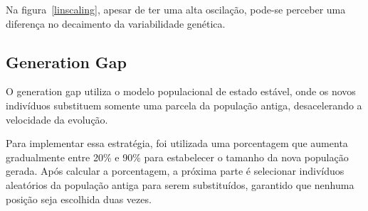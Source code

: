 \documentclass[12pt]{article}
\begin{document}
Na figura~\ref{linscaling}, apesar de ter uma alta oscilação, pode-se perceber uma 
diferença no decaimento da variabilidade genética.

\subsection{Generation Gap}

O generation gap utiliza o modelo populacional de estado estável, onde os novos 
indivíduos substituem somente uma parcela da população antiga, desacelerando a velocidade 
da evolução. 

Para implementar essa estratégia, foi utilizada uma porcentagem que aumenta gradualmente 
entre 20\% e 90\% para estabelecer o tamanho da nova população gerada. Após calcular a 
porcentagem, a próxima parte é selecionar indivíduos aleatórios da população antiga para 
serem substituídos, garantido que nenhuma posição seja escolhida duas vezes.
\end{document}
